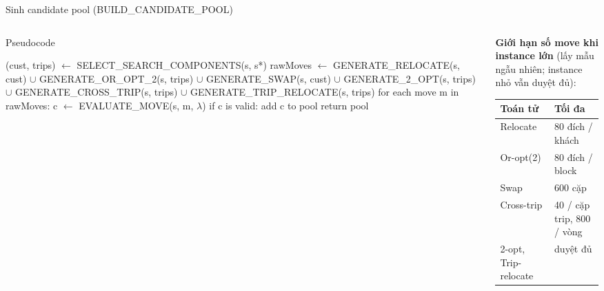 \documentclass[aspectratio=169]{beamer}
\newenvironment{pseudo}{\par\scriptsize\ttfamily\obeylines\obeyspaces}{\par}
\newcommand{\ind}{\hspace*{1.2em}}
\begin{document}
\begin{frame}[fragile]{Sinh candidate pool (BUILD\_CANDIDATE\_POOL)}
  \begin{columns}[T]
    \begin{column}{0.5\textwidth}
      \begin{block}{Pseudocode}
        \begin{pseudo}
(cust, trips) $\leftarrow$ SELECT\_SEARCH\_COMPONENTS(s, s*)
rawMoves $\leftarrow$ GENERATE\_RELOCATE(s, cust)
\ind $\cup$ GENERATE\_OR\_OPT\_2(s, trips)
\ind $\cup$ GENERATE\_SWAP(s, cust)
\ind $\cup$ GENERATE\_2\_OPT(s, trips)
\ind $\cup$ GENERATE\_CROSS\_TRIP(s, trips)
\ind $\cup$ GENERATE\_TRIP\_RELOCATE(s, trips)
for each move m in rawMoves:
\ind c $\leftarrow$ EVALUATE\_MOVE(s, m, $\lambda$)
\ind if c is valid: add c to pool
return pool
        \end{pseudo}
      \end{block}
    \end{column}
    \begin{column}{0.5\textwidth}
      \textbf{Giới hạn số move khi instance lớn} (lấy mẫu ngẫu nhiên; instance nhỏ vẫn duyệt đủ):
      \begin{center}
      \small
      \begin{tabular}{ll}
        \toprule
        Toán tử & Tối đa \\
        \midrule
        Relocate & 80 đích / khách \\
        Or-opt(2) & 80 đích / block \\
        Swap & 600 cặp \\
        Cross-trip & 40 / cặp trip, 800 / vòng \\
        2-opt, Trip-relocate & duyệt đủ \\
        \bottomrule
      \end{tabular}
      \end{center}
    \end{column}
  \end{columns}
\end{frame}
\end{document}
